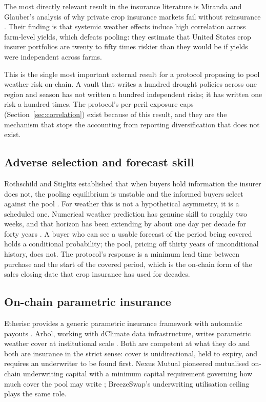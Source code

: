 \documentclass[11pt,a4paper]{article}
\begin{document}
The most directly relevant result in the insurance literature is Miranda and Glauber's
analysis of why private crop insurance markets fail without reinsurance \cite{miranda1997}.
Their finding is that systemic weather effects induce high correlation across farm-level
yields, which defeats pooling: they estimate that United States crop insurer portfolios are
twenty to fifty times riskier than they would be if yields were independent across farms.

This is the single most important external result for a protocol proposing to pool weather
risk on-chain. A vault that writes a hundred drought policies across one region and season
has not written a hundred independent risks; it has written one risk a hundred times. The
protocol's per-peril exposure caps (Section~\ref{sec:correlation}) exist because of this
result, and they are the mechanism that stops the accounting from reporting diversification
that does not exist.

\subsection{Adverse selection and forecast skill}

Rothschild and Stiglitz established that when buyers hold information the insurer does not,
the pooling equilibrium is unstable and the informed buyers select against the pool
\cite{rothschild1976}. For weather this is not a hypothetical asymmetry, it is a scheduled
one. Numerical weather prediction has genuine skill to roughly two weeks, and that horizon
has been extending by about one day per decade for forty years \cite{bauer2015}. A buyer
who can see a usable forecast of the period being covered holds a conditional probability;
the pool, pricing off thirty years of unconditional history, does not. The protocol's
response is a minimum lead time between purchase and the start of the covered period, which
is the on-chain form of the sales closing date that crop insurance has used for decades.

\subsection{On-chain parametric insurance}

Etherisc provides a generic parametric insurance framework with automatic payouts
\cite{etherisc}. Arbol, working with dClimate data infrastructure, writes parametric weather
cover at institutional scale \cite{arbol}. Both are competent at what they do and both are
insurance in the strict sense: cover is unidirectional, held to expiry, and requires an
underwriter to be found first. Nexus Mutual pioneered mutualised on-chain underwriting
capital with a minimum capital requirement governing how much cover the pool may write
\cite{nexus_mutual}; BreezeSwap's underwriting utilisation ceiling plays the same role.
\end{document}

